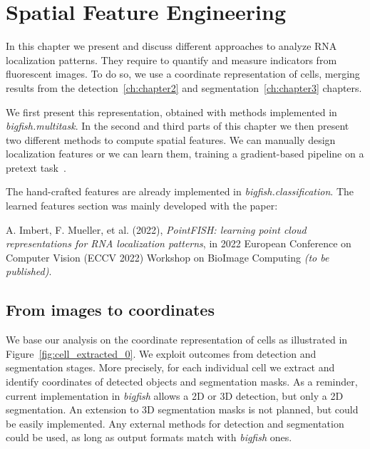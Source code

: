 
\graphicspath{{./figures/chapter4/}}


\chapter{Spatial Feature Engineering}
\label{ch:chapter4}

\minitoc
\newpage

In this chapter we present and discuss different approaches to analyze \ac{RNA} localization patterns.
They require to quantify and measure indicators from fluorescent images.
To do so, we use a coordinate representation of cells, merging results from the detection~\ref{ch:chapter2} and segmentation~\ref{ch:chapter3} chapters.

We first present this representation, obtained with methods implemented in \emph{bigfish.multitask}.
In the second and third parts of this chapter we then present two different methods to compute spatial features.
We can manually design localization features or we can learn them, training a gradient-based pipeline on a pretext task~\cite{pointfish_2022}.

The hand-crafted features are already implemented in \emph{bigfish.classification}.
The learned features section was mainly developed with the paper:


\begin{center}
	\color{green}
	A. Imbert, F. Mueller, et al. (2022), \textit{PointFISH: learning point cloud representations for RNA localization patterns}, in 2022 European Conference on Computer Vision (ECCV 2022) Workshop on BioImage Computing \textit{(to be published)}.
\end{center}

\section{From images to coordinates}
\label{sec:image_coordinates}

We base our analysis on the coordinate representation of cells as illustrated in Figure~\ref{fig:cell_extracted_0}.
We exploit outcomes from detection and segmentation stages.
More precisely, for each individual cell we extract and identify coordinates of detected objects and segmentation masks.
As a reminder, current implementation in \emph{bigfish} allows a 2D or 3D detection, but only a 2D segmentation.
An extension to 3D segmentation masks is not planned, but could be easily implemented.
Any external methods for detection and segmentation could be used, as long as output formats match with \emph{bigfish} ones.

